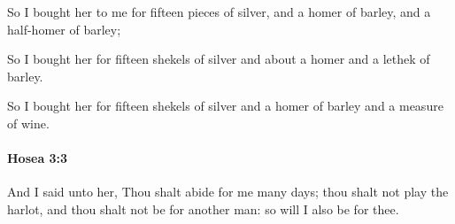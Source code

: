 			\begin{versebox}
					\item[BHS] 
					\item[LXX] 
					\item[ASV] So I bought her to me for fifteen pieces of silver, and a homer of barley, and a half-homer of barley;
					\item[NIV] So I bought her for fifteen shekels of silver and about a homer and a lethek of barley.
					\item[NRSV] So I bought her for fifteen shekels of silver and a homer of barley and a measure of wine.
			\end{versebox}

		\paragraph{Hosea 3:3} %
			\label{HOSEA-3-3}

			And I said unto her, Thou shalt abide for me many days; thou shalt not play the harlot, and thou shalt not be for another man: so will I also be for thee.

